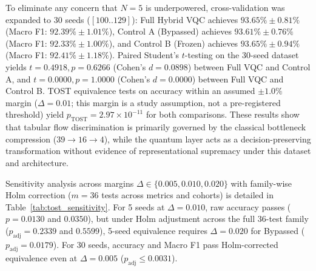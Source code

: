 \documentclass[conference]{IEEEtran}
\begin{document}
To eliminate any concern that $N=5$ is underpowered, cross-validation was expanded to 30 seeds ($[100..129]$): Full Hybrid VQC achieves $93.65\% \pm 0.81\%$ (Macro F1: $92.39\% \pm 1.01\%$), Control A (Bypassed) achieves $93.61\% \pm 0.76\%$ (Macro F1: $92.33\% \pm 1.00\%$), and Control B (Frozen) achieves $93.65\% \pm 0.94\%$ (Macro F1: $92.41\% \pm 1.18\%$). Paired Student's $t$-testing on the 30-seed dataset yields $t = 0.4918, p = 0.6266$ (Cohen's $d = 0.0898$) between Full VQC and Control A, and $t = 0.0000, p = 1.0000$ (Cohen's $d = 0.0000$) between Full VQC and Control B. TOST equivalence tests on accuracy within an assumed $\pm 1.0\%$ margin ($\Delta = 0.01$; this margin is a study assumption, not a pre-registered threshold) yield $p_{\text{TOST}} = 2.97 \times 10^{-11}$ for both comparisons. These results show that tabular flow discrimination is primarily governed by the classical bottleneck compression ($39 \to 16 \to 4$), while the quantum layer acts as a decision-preserving transformation without evidence of representational supremacy under this dataset and architecture.

Sensitivity analysis across margins $\Delta \in \{0.005, 0.010, 0.020\}$ with family-wise Holm correction ($m=36$ tests across metrics and cohorts) is detailed in Table~\ref{tab:tost_sensitivity}. For 5 seeds at $\Delta = 0.010$, raw accuracy passes ($p = 0.0130$ and $0.0350$), but under Holm adjustment across the full 36-test family ($p_{\text{adj}} = 0.2339$ and $0.5599$), 5-seed equivalence requires $\Delta = 0.020$ for Bypassed ($p_{\text{adj}} = 0.0179$). For 30 seeds, accuracy and Macro F1 pass Holm-corrected equivalence even at $\Delta = 0.005$ ($p_{\text{adj}} \le 0.0031$).
\end{document}
